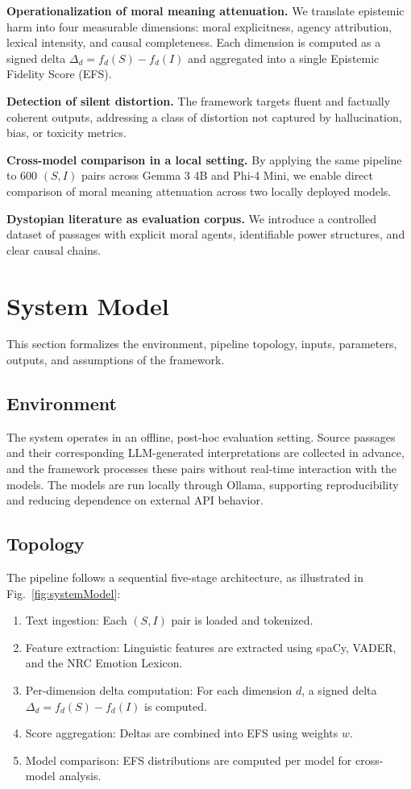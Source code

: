 \documentclass[10pt, conference]{IEEEtran}
\begin{document}
\textbf{Operationalization of moral meaning attenuation.} We translate epistemic harm into four measurable dimensions: moral explicitness, agency attribution, lexical intensity, and causal completeness. Each dimension is computed as a signed delta $\Delta_d = f_d(S) - f_d(I)$ and aggregated into a single Epistemic Fidelity Score (EFS).

\textbf{Detection of silent distortion.} The framework targets fluent and factually coherent outputs, addressing a class of distortion not captured by hallucination, bias, or toxicity metrics.

\textbf{Cross-model comparison in a local setting.} By applying the same pipeline to 600 $(S, I)$ pairs across Gemma 3 4B and Phi-4 Mini, we enable direct comparison of moral meaning attenuation across two locally deployed models.

\textbf{Dystopian literature as evaluation corpus.} We introduce a controlled dataset of passages with explicit moral agents, identifiable power structures, and clear causal chains.

\section{System Model}
\label{sec:system_model}

This section formalizes the environment, pipeline topology, inputs, parameters, outputs, and assumptions of the framework.

\subsection{Environment}

The system operates in an offline, post-hoc evaluation setting. Source passages and their corresponding LLM-generated interpretations are collected in advance, and the framework processes these pairs without real-time interaction with the models. The models are run locally through Ollama, supporting reproducibility and reducing dependence on external API behavior.

\subsection{Topology}

The pipeline follows a sequential five-stage architecture, as illustrated in Fig.~\ref{fig:systemModel}:

\begin{enumerate}
    \item Text ingestion: Each $(S, I)$ pair is loaded and tokenized.
    \item Feature extraction: Linguistic features are extracted using spaCy, VADER, and the NRC Emotion Lexicon.
    \item Per-dimension delta computation: For each dimension $d$, a signed delta $\Delta_d = f_d(S) - f_d(I)$ is computed.
    \item Score aggregation: Deltas are combined into EFS using weights $w$.
    \item Model comparison: EFS distributions are computed per model for cross-model analysis.
\end{enumerate}
\end{document}
